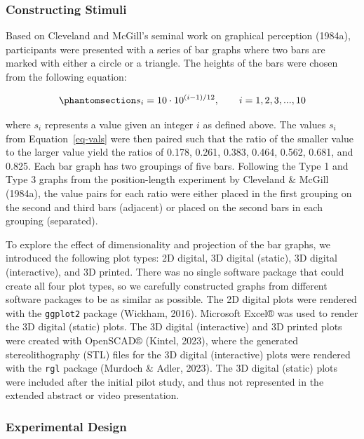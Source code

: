 \documentclass[phd]{nuthesis}
\begin{document}
\subsubsection{Constructing Stimuli}\label{constructing-stimuli}

Based on Cleveland and McGill's seminal work on graphical perception
(1984a), participants were presented with a series of bar graphs where
two bars are marked with either a circle or a triangle. The heights of
the bars were chosen from the following equation:

\begin{equation}\phantomsection\label{eq-vals}{s_i=10\cdot 10^{(i-1)/12}, \qquad i=1,2,3,...,10}\end{equation}

where \(s_i\) represents a value given an integer \(i\) as defined
above. The values \(s_i\) from Equation~\ref{eq-vals} were then paired
such that the ratio of the smaller value to the larger value yield the
ratios of 0.178, 0.261, 0.383, 0.464, 0.562, 0.681, and 0.825. Each bar
graph has two groupings of five bars. Following the Type 1 and Type 3
graphs from the position-length experiment by Cleveland \& McGill
(1984a), the value pairs for each ratio were either placed in the first
grouping on the second and third bars (adjacent) or placed on the second
bars in each grouping (separated).

To explore the effect of dimensionality and projection of the bar
graphs, we introduced the following plot types: 2D digital, 3D digital
(static), 3D digital (interactive), and 3D printed. There was no single
software package that could create all four plot types, so we carefully
constructed graphs from different software packages to be as similar as
possible. The 2D digital plots were rendered with the \texttt{ggplot2}
package (Wickham, 2016). Microsoft Excel® was used to render the 3D
digital (static) plots. The 3D digital (interactive) and 3D printed
plots were created with OpenSCAD® (Kintel, 2023), where the generated
stereolithography (STL) files for the 3D digital (interactive) plots
were rendered with the \texttt{rgl} package (Murdoch \& Adler, 2023).
The 3D digital (static) plots were included after the initial pilot
study, and thus not represented in the extended abstract or video
presentation.

\subsubsection{Experimental Design}\label{experimental-design}
\end{document}
